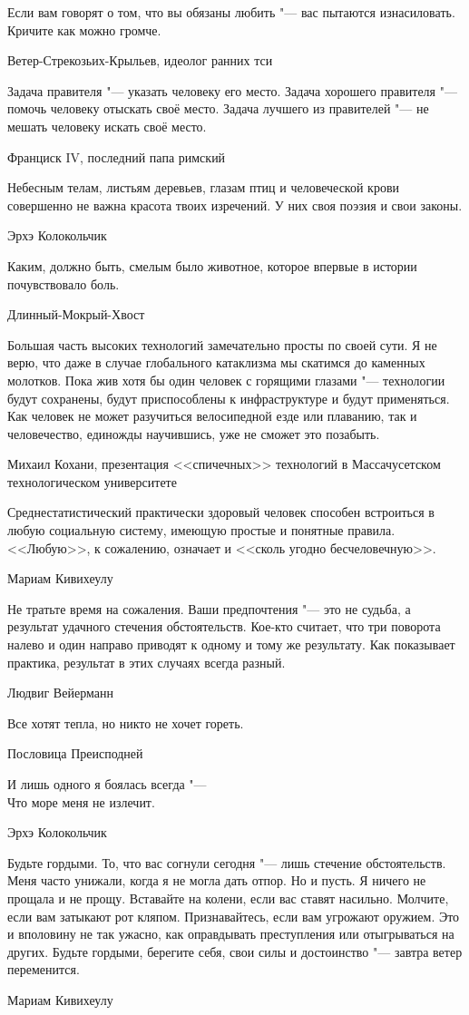 \epigraph
{Если вам говорят о том, что вы обязаны любить "--- вас пытаются изнасиловать.
Кричите как можно громче.}
{Ветер-Стрекозьих-Крыльев, идеолог ранних тси}

\epigraph
{Задача правителя "--- указать человеку его место.
Задача хорошего правителя "--- помочь человеку отыскать своё место.
Задача лучшего из правителей "--- не мешать человеку искать своё место.}
{Франциск IV, последний папа римский}

\epigraph
{Небесным телам, листьям деревьев, глазам птиц и человеческой крови совершенно не важна красота твоих изречений.
У них своя поэзия и свои законы.}
{Эрхэ Колокольчик}

\epigraph
{Каким, должно быть, смелым было животное, которое впервые в истории почувствовало боль.}
{Длинный-Мокрый-Хвост}

\epigraph
{Большая часть высоких технологий замечательно просты по своей сути.
Я не верю, что даже в случае глобального катаклизма мы скатимся до каменных молотков.
Пока жив хотя бы один человек с горящими глазами "--- технологии будут сохранены, будут приспособлены к инфраструктуре и будут применяться.
Как человек не может разучиться велосипедной езде или плаванию, так и человечество, единожды научившись, уже не сможет это позабыть.}
{Михаил Кохани, презентация <<спичечных>> технологий в Массачусетском технологическом университете}

\epigraph
{Среднестатистический практически здоровый человек способен встроиться в любую социальную систему, имеющую простые и понятные правила.
<<Любую>>, к сожалению, означает и <<сколь угодно бесчеловечную>>.}
{Мариам Кивихеулу}

\epigraph
{Не тратьте время на сожаления.
Ваши предпочтения "--- это не судьба, а результат удачного стечения обстоятельств.
Кое-кто считает, что три поворота налево и один направо приводят к одному и тому же результату.
Как показывает практика, результат в этих случаях всегда разный.}
{Людвиг Вейерманн}

\epigraph
{Все хотят тепла, но никто не хочет гореть.}
{Пословица Преисподней}

\epigraph
{\ldotst И лишь одного я боялась всегда "---\\
Что море меня не излечит.}
{Эрхэ Колокольчик}

\epigraph
{Будьте гордыми.
То, что вас согнули сегодня "--- лишь стечение обстоятельств.
Меня часто унижали, когда я не могла дать отпор.
Но и пусть.
Я ничего не прощала и не прощу.
Вставайте на колени, если вас ставят насильно.
Молчите, если вам затыкают рот кляпом.
Признавайтесь, если вам угрожают оружием.
Это и вполовину не так ужасно, как оправдывать преступления или отыгрываться на других.
Будьте гордыми, берегите себя, свои силы и достоинство "--- завтра ветер переменится.}
{Мариам Кивихеулу}

